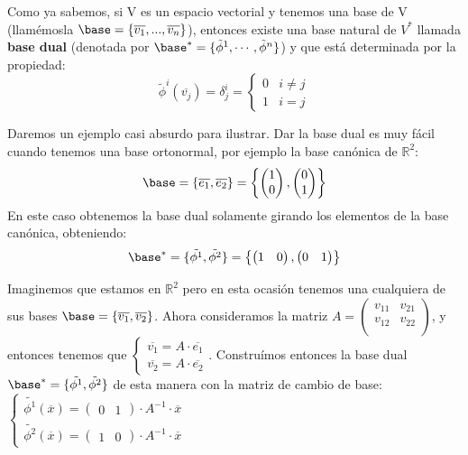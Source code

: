 \documentclass[palatino, bibnumbers]{apuntes}
\begin{document}
Como ya sabemos, si V es un espacio vectorial y tenemos una base de V (llamémosla $\base = \{ \overline{v_1},...,\overline{v_n} \}$), entonces existe una base natural de $V^{*}$
llamada \textbf{base dual} (denotada por $\base^{*}=\{\tilde{\phi}^{1},\cdots ,\tilde{\phi}^{n}\}$) y que está determinada por la propiedad: $$\tilde{\phi}^{i}(\overline{v_j})=\delta_j^{i} = \begin{cases} 0 & i ≠ j \\ 1 & i = j \end{cases}$$
\newpage
\begin{example} Daremos un ejemplo casi absurdo para ilustrar. Dar la base dual es muy fácil cuando tenemos una base ortonormal, por ejemplo la base canónica de $ℝ^{2}$:
$$\base = \{\overline{e_1},\overline{e_2}\}=\left\{\begin{pmatrix}1\\0\end{pmatrix},\begin{pmatrix}0\\1\end{pmatrix}\right\}$$En este caso obtenemos la base dual solamente girando los elementos de la base canónica, obteniendo: $$\base^{*} =\{\tilde{\phi^{1}},\tilde{\phi^{2}}\}=\left\{\begin{pmatrix}1&0\end{pmatrix},\begin{pmatrix}0&1\end{pmatrix}\right\}$$
\end{example}
\begin{example} Imaginemos que estamos en $ℝ^{2}$ pero en esta ocasión tenemos una cualquiera de sus bases $\base=\{\overline{v_1},\overline{v_2}\}$. Ahora consideramos la matriz $A=\begin{pmatrix}v_{11}&v_{21}\\v_{12}&v_{22}\\ \end{pmatrix}$, y entonces tenemos que $\begin{cases}\overline{v_1}=A\cdot \overline{e_1} \\\overline{v_2}=A\cdot \overline{e_2}\end{cases}$. Construímos entonces la base dual $\base^{*}=\{ \tilde{\phi^{1}},\tilde{\phi^{2}}\}$ de esta manera con la matriz de cambio de base: $\begin{cases} \tilde{\phi^{1}}(\overline{x})=\begin{pmatrix}0&1\end{pmatrix}\cdot A^{-1}\cdot \overline{x} \\\tilde{\phi^{2}}(\overline{x})=\begin{pmatrix}1&0\end{pmatrix}\cdot A^{-1}\cdot \overline{x}\end{cases}$
\end{example}
\end{document}
